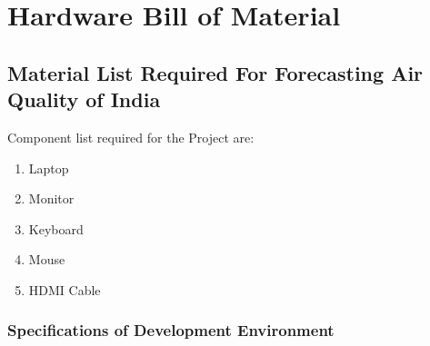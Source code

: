 %
%
%
\chapter{Hardware Bill of Material}

\section{Material List Required For Forecasting Air Quality of India }

Component list required for the Project are:
\begin{enumerate}
	\item Laptop
	
	\item Monitor
	
	\item Keyboard
	
	\item Mouse
	
	\item HDMI Cable
\end{enumerate}

\subsection{Specifications of Development Environment}

